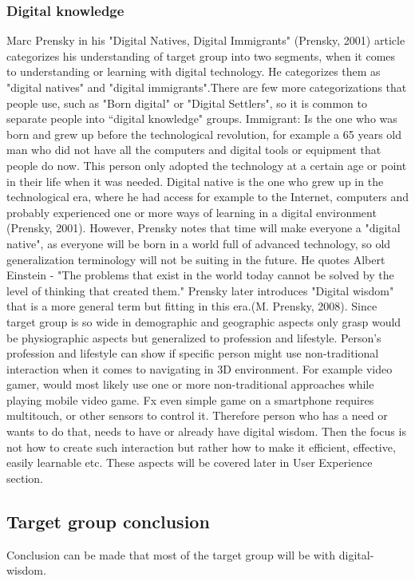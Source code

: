 \subsubsection{Digital knowledge}
Marc Prensky in his "Digital Natives, Digital Immigrants" (Prensky, 2001) article categorizes his understanding of target group into two segments, when it comes to understanding or learning with digital technology. He categorizes them as "digital natives" and "digital immigrants".There are few more categorizations that people use, such as "Born digital" or "Digital Settlers", so it is common to separate people into “digital knowledge" groups.  Immigrant: Is the one who was born and grew up before the technological revolution, for example a 65 years old man who did not have all the computers and digital tools or equipment that people do now. This person only adopted the technology at a certain age or point in their life when it was needed. Digital native is the one who grew up in the technological era, where he had access for example to the Internet, computers and probably experienced one or more ways of learning in a digital environment (Prensky, 2001). However, Prensky notes that time will make everyone a "digital native", as everyone will be born in a world full of advanced technology, so old generalization terminology will not be suiting in the future. He quotes Albert Einstein - "The problems that exist in the world today cannot be solved by the level of thinking that created them." Prensky later introduces "Digital wisdom" that is a more general term but fitting in this era.(M. Prensky, 2008). Since target group is so wide in demographic and geographic aspects only grasp would be physiographic aspects but generalized to profession and lifestyle. Person's profession and lifestyle can show if specific person might use non-traditional interaction when it comes to navigating in 3D environment. For example video gamer, would most likely use one or more non-traditional approaches while playing mobile video game. Fx even simple game on a smartphone requires multitouch, or other sensors to control it. 
Therefore person who has a need or wants to do that, needs to have or already have digital wisdom. Then the focus is not how to create such interaction but rather how to make it efficient, effective, easily learnable etc. These aspects will be covered later in User Experience section.

\subsection{Target group conclusion}
Conclusion can be made that most of the target group will be with digital-wisdom.